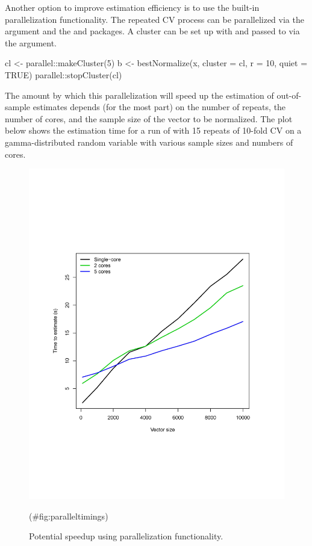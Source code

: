Another option to improve estimation efficiency is to use the built-in
parallelization functionality. The repeated CV process can be
parallelized via the  argument and the 
and  \citep{doRNG} packages. A cluster can be set up with
 and passed to  via the
 argument.

\begin{Schunk}
\begin{Sinput}
cl <- parallel::makeCluster(5)
b <- bestNormalize(x, cluster = cl, r = 10, quiet = TRUE)
parallel::stopCluster(cl)
\end{Sinput}
\end{Schunk}

The amount by which this parallelization will speed up the estimation of
out-of-sample estimates depends (for the most part) on the number of
repeats, the number of cores, and the sample size of the vector to be
normalized. The plot below shows the estimation time for a run of
 with 15 repeats of 10-fold CV on a
gamma-distributed random variable with various sample sizes and numbers
of cores.

\begin{Schunk}
\begin{figure}

{\centering \includegraphics[width=1\linewidth]{figs/parallel_timings} 

}

\caption[Potential speedup using parallelization functionality]{Potential speedup using parallelization functionality.}(\#fig:paralleltimings)
\end{figure}
\end{Schunk}

